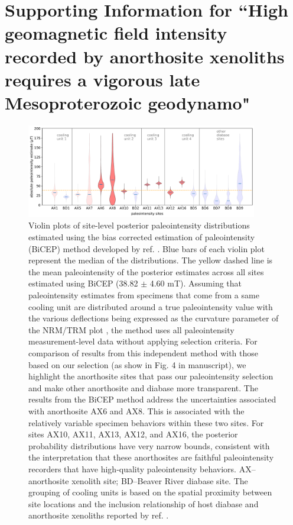 \chapter[Supporting Information for ``High geomagnetic field intensity recorded by anorthosite xenoliths requires a vigorous late Mesoproterozoic geodynamo"][Supporting Information--Late Mesoproterozoic Geodynamo]{Supporting Information for ``High geomagnetic field intensity recorded by anorthosite xenoliths requires a vigorous late Mesoproterozoic geodynamo"}


\begin{figure}
\noindent\includegraphics[width=0.9\textwidth]{figure/Zhang2022/PINT_BiCEP.pdf}
\centering
\caption{{Violin plots of site-level posterior paleointensity distributions estimated using the bias corrected estimation of paleointensity (BiCEP) method developed by ref. \citealp{Cych2021a}. Blue bars of each violin plot represent the median of the distributions. The yellow dashed line is the mean paleointensity of the posterior estimates across all sites estimated using BiCEP (38.82 $\pm$ 4.60 mT). Assuming that paleointensity estimates from specimens that come from a same cooling unit are distributed around a true paleointensity value with the various deflections being expressed as the curvature parameter of the NRM/TRM plot \cite{Arai1963a, Paterson2011a}, the method uses all paleointensity measurement-level data without applying selection criteria. For comparison of results from this independent method with those based on our selection (as show in Fig. 4 in manuscript), we highlight the anorthosite sites that pass our paleointensity selection and make other anorthosite and diabase more transparent. The results from the BiCEP method address the uncertainties associated with anorthosite AX6 and AX8. This is associated with the relatively variable specimen behaviors within these two sites. For sites AX10, AX11, AX13, AX12, and AX16, the posterior probability distributions have very narrow bounds, consistent with the interpretation that these anorthosites are faithful paleointensity recorders that have high-quality paleointensity behaviors. AX--anorthosite xenolith site; BD--Beaver River diabase site. The grouping of cooling units is based on the spatial proximity between site locations and the inclusion relationship of host diabase and anorthosite xenoliths reported by ref. \citealp{Zhang2021b}.}}
\label{fig:PINT_BiCEP}
\end{figure}


